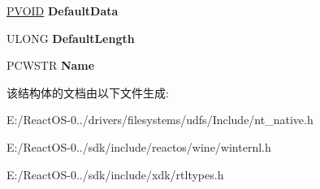 \begin{DoxyCompactItemize}
\hyperlink{interfacevoid}{P\+V\+O\+ID} {\bfseries Default\+Data}
\item 
\mbox{\label{struct___r_t_l___q_u_e_r_y___r_e_g_i_s_t_r_y___t_a_b_l_e_aadbce9163db26d263f7d173380e60152}} 
U\+L\+O\+NG {\bfseries Default\+Length}
\item 
\mbox{\label{struct___r_t_l___q_u_e_r_y___r_e_g_i_s_t_r_y___t_a_b_l_e_a381c2175244984eac8e7134377462474}} 
P\+C\+W\+S\+TR {\bfseries Name}
\end{DoxyCompactItemize}


该结构体的文档由以下文件生成\+:\begin{DoxyCompactItemize}
\item 
E\+:/\+React\+O\+S-\/0../drivers/filesystems/udfs/\+Include/nt\+\_\+native.\+h\item 
E\+:/\+React\+O\+S-\/0../sdk/include/reactos/wine/winternl.\+h\item 
E\+:/\+React\+O\+S-\/0../sdk/include/xdk/rtltypes.\+h\end{DoxyCompactItemize}
